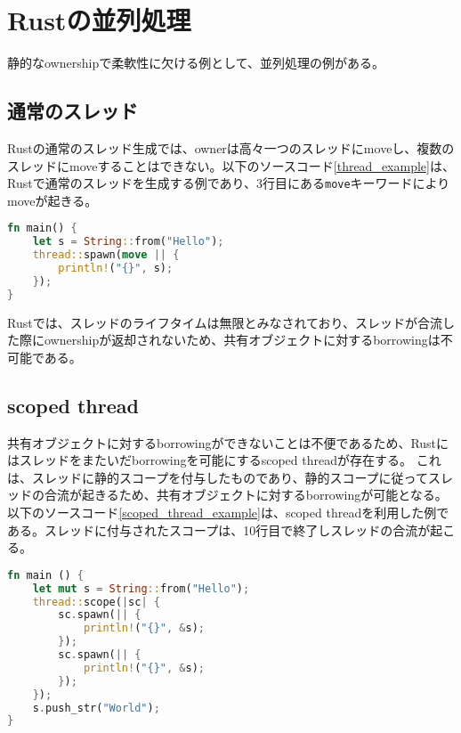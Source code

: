 \documentclass{sumiilab-paper}
\theoremstyle{mystyle}
\numberwithin{definition}{chapter} %
\begin{document}
\section{Rustの並列処理}
静的なownershipで柔軟性に欠ける例として、並列処理の例がある。

\subsection{通常のスレッド}
Rustの通常のスレッド生成では、ownerは高々一つのスレッドにmoveし、複数のスレッドにmoveすることはできない。以下のソースコード\ref{thread_example}は、Rustで通常のスレッドを生成する例であり、3行目にある\texttt{move}キーワードによりmoveが起きる。
\begin{lstlisting}[language=Rust, caption=Rustでの通常のスレッド生成の例, label=thread_example, captionpos=b]
fn main() {
    let s = String::from("Hello");
    thread::spawn(move || {
        println!("{}", s);
    });
}
\end{lstlisting}

Rustでは、スレッドのライフタイムは無限とみなされており、スレッドが合流した際にownershipが返却されないため、共有オブジェクトに対するborrowingは不可能である。

\subsection{scoped thread}
共有オブジェクトに対するborrowingができないことは不便であるため、Rustにはスレッドをまたいだborrowingを可能にするscoped threadが存在する。
これは、スレッドに静的スコープを付与したものであり、静的スコープに従ってスレッドの合流が起きるため、共有オブジェクトに対するborrowingが可能となる。
以下のソースコード\ref{scoped_thread_example}は、scoped threadを利用した例である。スレッドに付与されたスコープは、10行目で終了しスレッドの合流が起こる。
\begin{lstlisting}[language=Rust, caption=scoped threadの例, label=scoped_thread_example, captionpos=b]
fn main () {
    let mut s = String::from("Hello");
    thread::scope(|sc| {
        sc.spawn(|| {
            println!("{}", &s);
        });
        sc.spawn(|| {
            println!("{}", &s);
        });
    });
    s.push_str("World");
}
\end{lstlisting}
\end{document}
